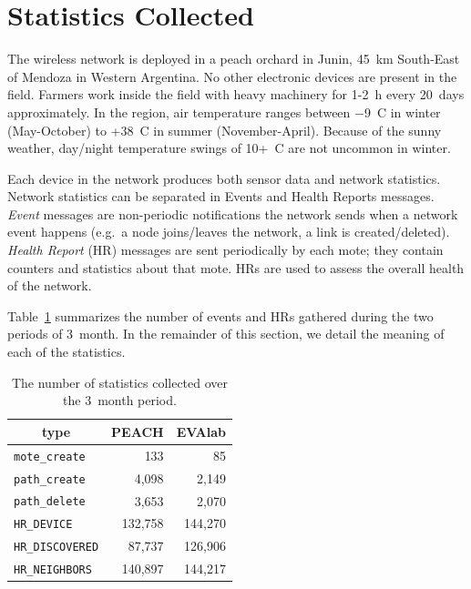 \documentclass{elsarticle}
\newcommand{\HRNEIGHBORS}         {{\tt HR\_NEIGHBORS}\xspace}
\newcommand{\HRDISCOVERED}        {{\tt HR\_DISCOVERED}\xspace}
\newcommand{\HRDEVICE}            {{\tt HR\_DEVICE}\xspace}
\newcommand{\pathcreate}          {{\tt path\_create}\xspace}
\newcommand{\pathdelete}          {{\tt path\_delete}\xspace}
\newcommand{\motecreate}          {{\tt mote\_create}\xspace}
\newcommand{\PEACHNUMHRNEIGHBORS} {140,897\xspace}
\newcommand{\EVANUMHRNEIGHBORS}   {144,217\xspace}
\begin{document}
\section{Statistics Collected}
\label{sec:collected}


The wireless network is deployed in a peach orchard in Junin, 45~km South-East of Mendoza in Western Argentina.
No other electronic devices are present in the field.
Farmers work inside the field with heavy machinery for 1-2~h every 20~days approximately.
In the region, air temperature ranges between $-$9~C in winter (May-October) to +38~C in summer (November-April).
Because of the sunny weather, day/night temperature swings of 10+~C are not uncommon in winter.


Each device in the network produces both sensor data and network statistics.
Network statistics can be separated in Events and Health Reports messages.
\textit{Event} messages are non-periodic notifications the network sends when a network event happens (e.g.~a node joins/leaves the network, a link is created/deleted).
\textit{Health Report} (HR) messages are sent periodically by each mote; they contain counters and statistics about that mote.
HRs are used to assess the overall health of the network.


Table~\ref{tab:msg_stats} summarizes the number of events and HRs gathered during the two periods of 3~month.
In the remainder of this section, we detail the meaning of each of the statistics.

\begin{table}
    \centering
    \begin{tabular}{|l|r|r|}
        \toprule
        \multicolumn{1}{|c|}{type} & \multicolumn{1}{|c|}{PEACH} & \multicolumn{1}{|c|}{EVAlab} \\ \hline
        \hline
        \motecreate     &     133     &   85 \\ \hline
        \pathcreate     &   4,098     &   2,149 \\ \hline
        \pathdelete     &   3,653     &   2,070 \\ \hline
        \HRDEVICE       & 132,758     &   144,270 \\ \hline
        \HRDISCOVERED   &  87,737     &   126,906 \\ \hline
        \HRNEIGHBORS    & \PEACHNUMHRNEIGHBORS & \EVANUMHRNEIGHBORS\\ \hline
    \end{tabular}
    \caption{The number of statistics collected over the 3~month period.}
    \label{tab:msg_stats}
\end{table}
\end{document}
